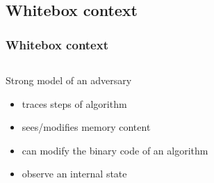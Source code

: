 \documentclass{beamer}
\begin{document}
\subsection{Whitebox context}
\begin{frame}
    \frametitle{Whitebox context}
  \begin{columns}
     \begin{column}{0.45\textwidth}
	Strong model of an adversary
	\begin{itemize}
	 \item traces steps of algorithm
	 \item sees/modifies memory content
	 \item can modify the binary code of an algorithm
	 \item observe an internal state
	\end{itemize}
      \end{column}

     \begin{column}{0.55\textwidth}
 	\centerline{}
     \end{column}
     \end{columns}
\end{frame}
\end{document}
